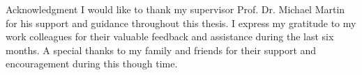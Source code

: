 \vspace*{0pt plus 1fill}
\begin{tucsimplesection}{Acknowledgment}
I would like to thank my supervisor Prof. Dr. Michael Martin for his support and guidance throughout this thesis.
I express my gratitude to my work colleagues for their valuable feedback and assistance during the last six months. 
A special thanks to my family and friends for their support and encouragement during this though time.
\end{tucsimplesection}
\vspace*{0pt plus 2.5fill}